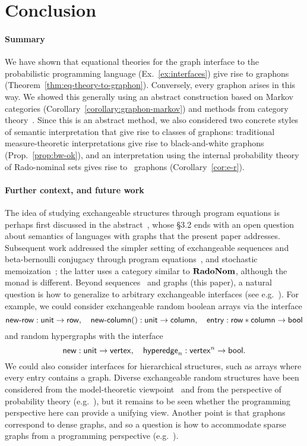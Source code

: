 \section{Conclusion}
\label{sec:relatedwork}
%
\paragraph{Summary}
We have shown that equational theories for the graph interface to the probabilistic programming language (Ex.~\ref{ex:interfaces}) give rise to graphons (Theorem~\ref{thm:eq-theory-to-graphon}).
Conversely, every graphon arises in this way. We showed this generally using an abstract construction based on Markov categories (Corollary~\ref{corollary:graphon-markov}) and methods from category theory~\cite{hermida-tennent,hu-tholen}. Since this is an abstract method, we also considered two concrete styles of semantic interpretation that give rise to classes of graphons: traditional measure-theoretic interpretations give rise to black-and-white graphons (Prop.~\ref{prop:bw-ok}), and an interpretation using the internal probability theory of Rado-nominal sets gives rise to \ErdosRenyi\ graphons (Corollary~\ref{cor:e-r}).

\paragraph{Further context, and future work}

The idea of studying exchangeable structures through program equations is perhaps first discussed in the abstract~\cite{XRPDA-PPS2017}, whose \S3.2 ends with an open question about semantics of languages with graphs that the present paper addresses.
Subsequent work addressed the simpler setting of exchangeable sequences and beta-bernoulli conjugacy through program equations~\cite{Staton-BB18-short},
and stochastic memoization~\cite{kaddar-staton-stoch-mem}; the latter uses a category similar to $\mathbf{RadoNom}$, although the monad is different. %
Beyond sequences~\cite{Staton-BB18-short} and graphs (this paper), a natural question is how to generalize to arbitrary exchangeable interfaces (see e.g.~\cite{6847223}). 
For example, we could consider exchangeable random boolean arrays via the interface
\[
  \mathsf{new\text-row}:\mathsf{unit}\to\mathsf{row},\quad\mathsf{new\text-column()}:\mathsf{unit}\to\mathsf{column},\quad
  \mathsf{entry}:\mathsf{row}*\mathsf{column}\to \mathsf{bool}
\]
and random hypergraphs with the interface 
\[
  \mathsf{new}:\mathsf{unit} \to \mathsf{vertex},\quad
  \mathsf{hyperedge}_n:\mathsf{vertex}^n\to \mathsf{bool}\text.
\]
We could also consider interfaces for hierarchical structures, such as arrays where every entry contains a graph. Diverse exchangeable random structures have been considered from the model-theoretic viewpoint~\cite{ackerman-autm-invariant,crane-towsner} and from the perspective of probability theory (e.g.~\cite{kallenberg-2010,Campbell23,jlsy-dags}), but it remains to be seen whether the programming perspective here can provide a unifying view. Another point is that graphons correspond to dense graphs, and so a question is how to accommodate sparse graphs from a programming perspective (e.g.~\cite{10.1111/rssb.12233,10.1214/18-AOS1778}). 

